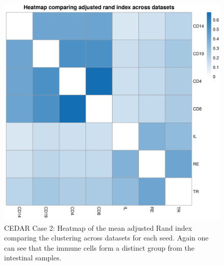 \documentclass[12pt]{article} %
\begin{document}
	\begin{figure}[h]
		\centering
		\includegraphics[scale=0.75]{Images/Biology_data/Set_1000/All_datasets/Arandi_heatmap.png}
		\caption{CEDAR Case 2: Heatmap of the mean adjusted Rand index comparing the clustering across datasets for each seed. Again one can see that the immune cells form a distinct group from the intestinal samples.}
		\label{fig:results:cedar_2:mdi_adj_rand_ind_heatmap}
	\end{figure}
	
	
\end{document}
